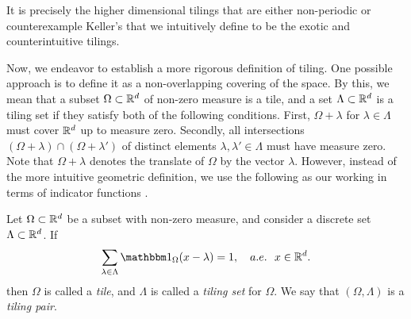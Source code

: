 \documentclass[../thesis.tex]{subfiles}
\begin{document}
It is precisely the higher dimensional tilings that are either non-periodic or counterexample Keller's  that we intuitively define to be the exotic and counterintuitive tilings.

Now, we endeavor to establish a more rigorous definition of tiling. One possible approach is to define it as a non-overlapping covering of the space. By this, we mean that a subset $\Omega \subset \mathbb{R}^d$ of non-zero measure is a tile, and a set $\Lambda \subset \mathbb{R}^d$ is a tiling set if they satisfy both of the following conditions. First, $\Omega+\lambda$ for $\lambda \in \Lambda$ must cover $\mathbb{R}^d$ up to measure zero. Secondly, all intersections $(\Omega+\lambda) \cap (\Omega+\lambda')$ of distinct elements $\lambda,\lambda' \in \Lambda$ must have measure zero. Note that $\Omega+\lambda$ denotes the translate of $\Omega$ by the vector $\lambda$. However, instead of the more intuitive geometric definition, we use the following as our working  in terms of indicator functions \cite{kolountzakisTilingsTranslation2010,kolountzakisStructureTilingsLine1996}.  %
\begin{definition}\label{def:tiling}
    Let $\Omega \subset \mathbb{R}^d$ be a subset with non-zero measure, and consider a discrete set $\Lambda \subset \mathbb{R}^d$. If
    \begin{equation}\label{eq:tiling_set}
        \sum_{\lambda \in \Lambda} \indicator{\Omega}{x-\lambda} = 1, \quad a.e. \text{\space\space} x \in \R^d.
    \end{equation}
    then $\Omega$ is called a \emph{tile}, and $\Lambda$ is called a \emph{tiling set} for $\Omega$. We say that $(\Omega, \Lambda)$ is a \emph{tiling pair}.
\end{definition}
\end{document}
